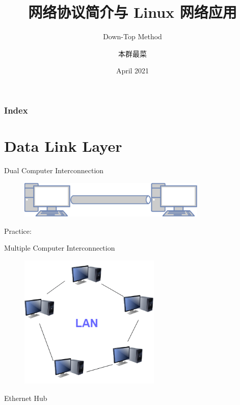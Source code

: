 \documentclass[UTF8]{ctexbeamer}
\title{网络协议简介与 Linux 网络应用}
\subtitle{Down-Top Method}
\author[Linux 开源学生俱乐部]
{本群最菜 %
}
\date{April 2021}
\begin{document}
\frame{\titlepage}
\begin{frame}
	\frametitle{Index}
	\tableofcontents
\end{frame}

\section{Data Link Layer}
\begin{frame}{Dual Computer Interconnection}
    
    \begin{figure}
        \centering
        \includegraphics[width=0.8\textwidth]{dual-computer-interconnection.png}
    \end{figure}
    Practice: 
\end{frame}
\begin{frame}{Multiple Computer Interconnection}
    \begin{figure}
        \centering
        \includegraphics[width=0.6\textwidth]{lan.png}
    \end{figure}
\end{frame}

\begin{frame}{Ethernet Hub}
    
\end{frame}
\end{document}
